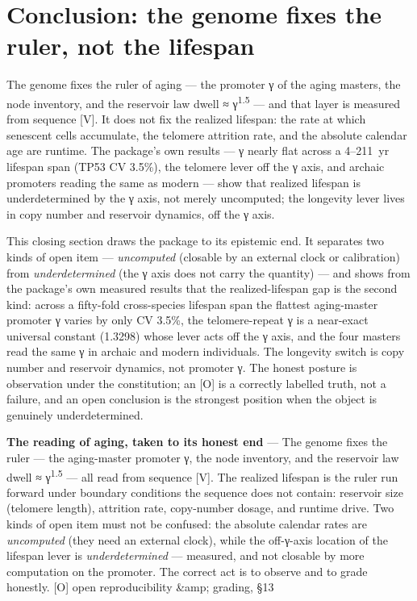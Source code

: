 \documentclass[11pt]{article}
\begin{document}
\clearpage

\section{Conclusion: the genome fixes the ruler, not the lifespan}

\begin{answerbox}The genome fixes the ruler of aging — the promoter γ of the aging masters, the node inventory, and the reservoir law dwell ≈ γ\textsuperscript{1.5} — and that layer is measured from sequence [V]. It does not fix the realized lifespan: the rate at which senescent cells accumulate, the telomere attrition rate, and the absolute calendar age are runtime. The package's own results — γ nearly flat across a 4–211 yr lifespan span (TP53 CV 3.5\%), the telomere lever off the γ axis, and archaic promoters reading the same as modern — show that realized lifespan is underdetermined by the γ axis, not merely uncomputed; the longevity lever lives in copy number and reservoir dynamics, off the γ axis.\end{answerbox}

\begin{abstractbox}This closing section draws the package to its epistemic end. It separates two kinds of open item — \textit{uncomputed} (closable by an external clock or calibration) from \textit{underdetermined} (the γ axis does not carry the quantity) — and shows from the package's own measured results that the realized-lifespan gap is the second kind: across a fifty-fold cross-species lifespan span the flattest aging-master promoter γ varies by only CV 3.5\%, the telomere-repeat γ is a near-exact universal constant (1.3298) whose lever acts off the γ axis, and the four masters read the same γ in archaic and modern individuals. The longevity switch is copy number and reservoir dynamics, not promoter γ. The honest posture is observation under the constitution; an [O] is a correctly labelled truth, not a failure, and an open conclusion is the strongest position when the object is genuinely underdetermined.\end{abstractbox}

\begin{vpbox}\textbf{The reading of aging, taken to its honest end} — The genome fixes the ruler — the aging-master promoter γ, the node inventory, and the reservoir law dwell ≈ γ\textsuperscript{1.5} — all read from sequence [V]. The realized lifespan is the ruler run forward under boundary conditions the sequence does not contain: reservoir size (telomere length), attrition rate, copy-number dosage, and runtime drive. Two kinds of open item must not be confused: the absolute calendar rates are \textit{uncomputed} (they need an external clock), while the off-γ-axis location of the lifespan lever is \textit{underdetermined} — measured, and not closable by more computation on the promoter. The correct act is to observe and to grade honestly. [O] open reproducibility \&amp; grading, §13\end{vpbox}
\end{document}

